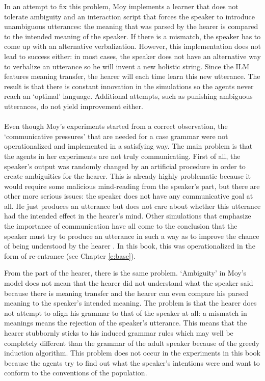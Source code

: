 In an attempt to fix this problem, Moy implements a learner that does not tolerate ambiguity and an interaction script that forces the speaker to introduce unambiguous utterances: the meaning that was parsed by the hearer is compared to the intended meaning of the speaker. If there is a mismatch, the speaker has to come up with an alternative verbalization. However, this implementation does not lead to success either: in most cases, the speaker does not have an alternative way to verbalize an utterance so he will invent a new holistic string. Since the ILM features meaning transfer, the hearer will each time learn this new utterance. The result is that there is constant innovation in the simulations so the agents never reach an `optimal' language. Additional attempts, such as punishing ambiguous utterances, do not yield improvement either.
\\
\\
 Even though Moy's experiments started from a correct observation, the `communicative pressures' that are needed for a case grammar were not operationalized and implemented in a satisfying way. The main problem is that the agents in her experiments are not truly communicating. First of all, the speaker's output was randomly changed by an artificial procedure in order to create ambiguities for the hearer. This is already highly problematic because it would require some malicious mind-reading from the speaker's part, but there are other more serious issues: the speaker does not have any communicative goal at all. He just produces an utterance but does not care about whether this utterance had the intended effect in the hearer's mind. Other simulations that emphasize the importance of communication have all come to the conclusion that the speaker must try to produce an utterance in such a way as to improve the chance of being understood by the hearer \citep{smith03intelligent, steels03language}. In this book, this was operationalized in the form of re-entrance (see Chapter \ref{c:base}).

From the part of the hearer, there is the same problem. `Ambiguity' in Moy's model does not mean that the hearer did not understand what the speaker said because there is meaning transfer and the hearer can even compare his parsed meaning to the speaker's intended meaning. The problem is that the hearer does not attempt to align his grammar to that of the speaker at all: a mismatch in meanings means the rejection of the speaker's utterance. This means that the hearer stubbornly sticks to his induced grammar rules which may well be completely different than the grammar of the adult speaker because of the greedy induction algorithm. This problem does not occur in the experiments in this book because the agents try to find out what the speaker's intentions were and want to conform to the conventions of the population.

